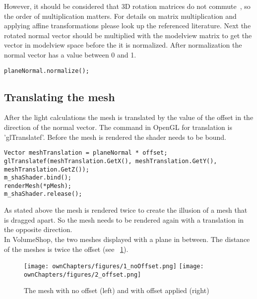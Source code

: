 \newline
However, it should be considered that 3D rotation matrices do not commute~\cite{book:computerGraphicsHill}, so the order of multiplication matters. For details on matrix multiplication and applying affine transformations please look up the referenced literature. \cite{book:computerGraphicsHill} \cite{book:computerGraphicsHearn}
\newline
Next the rotated normal vector should be multiplied with the modelview matrix to get the vector in modelview space before the it is normalized. After normalization the normal vector has a value between 0 and 1.
\begin{lstlisting}
planeNormal.normalize();
\end{lstlisting}

\subsection{Translating the mesh}
After the light calculations the mesh is translated by the value of the offset in the direction of the normal vector. The command in OpenGL for translation is 'glTranslatef'. Before the mesh is rendered the shader needs to be bound.
\begin{lstlisting}
Vector meshTranslation = planeNormal * offset;
glTranslatef(meshTranslation.GetX(), meshTranslation.GetY(), meshTranslation.GetZ());
m_shaShader.bind();
renderMesh(*pMesh);
m_shaShader.release();
\end{lstlisting}
As stated above the mesh is rendered twice to create the illusion of a mesh that is dragged apart. So the mesh needs to be rendered again with a translation in the opposite direction.\\
In VolumeShop, the two meshes displayed with a plane in between. The distance of the meshes is twice the offset (see ~\ref{fig:offset}).

\begin{figure}%
\centering
\texttt{[image: ownChapters/figures/1\_noOffset.png]}%
\hspace{7.00mm}
\texttt{[image: ownChapters/figures/2\_offset.png]}%
\caption{The mesh with no offset (left) and with offset applied (right)}%
\label{fig:offset}%
\end{figure}


